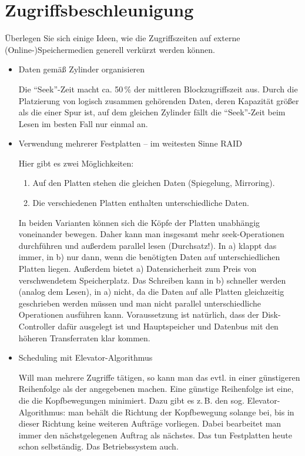 \section{Zugriffsbeschleunigung}
Überlegen Sie sich einige Ideen, wie die Zugriffszeiten auf externe (Online-)Spei\-cher\-me\-di\-en generell verkürzt werden können.

\begin{solution}
\begin{itemize}
	\item Daten gemäß Zylinder organisieren

	Die "`Seek"'-Zeit macht ca. 50\,\% der mittleren Blockzugriffszeit aus. Durch die Platzierung von logisch zusammen gehörenden Daten, deren Kapazität größer als die einer Spur ist, auf dem gleichen Zylinder fällt die "`Seek"'-Zeit beim Lesen im besten Fall nur einmal an.


	\item Verwendung mehrerer Festplatten -- im weitesten Sinne RAID

	Hier gibt es zwei Möglichkeiten:
	\begin{enumerate}
		\item Auf den Platten stehen die gleichen Daten (Spiegelung, Mirroring).
		\item Die verschiedenen Platten enthalten unterschiedliche Daten.
	\end{enumerate}
	In beiden Varianten können sich die Köpfe der Platten unabhängig voneinander bewegen. 	Daher kann man insgesamt mehr seek-Operationen durchführen und außerdem parallel lesen (Durchsatz!).
	In a) klappt das immer, in b) nur dann, wenn die benötigten Daten auf unterschiedlichen 	Platten liegen. Außerdem bietet a) Datensicherheit zum Preis von verschwendetem 	Speicherplatz.
	Das Schreiben kann in b) schneller werden (analog dem Lesen), in a) nicht, da die Daten 	auf alle Platten gleichzeitig geschrieben werden müssen und man nicht parallel 	unterschiedliche Operationen ausführen kann.
Voraussetzung ist natürlich, dass der Disk-Controller dafür ausgelegt ist und Hauptspeicher und Datenbus mit den höheren Transferraten klar kommen.


	\item Scheduling mit Elevator-Algorithmus

	Will man mehrere Zugriffe tätigen, so kann man das evtl. in einer günstigeren Reihenfolge als der angegebenen machen. Eine günstige Reihenfolge ist eine, die die Kopfbewegungen minimiert. Dazu gibt es z.\,B. den sog. Elevator-Algorithmus: man behält die Richtung der Kopfbewegung solange bei, bis in dieser Richtung keine weiteren Aufträge vorliegen. Dabei bearbeitet man immer den nächstgelegenen Auftrag als nächstes. Das tun Festplatten heute schon selbständig. Das Betriebssystem auch.



\end{itemize}
\end{solution}
